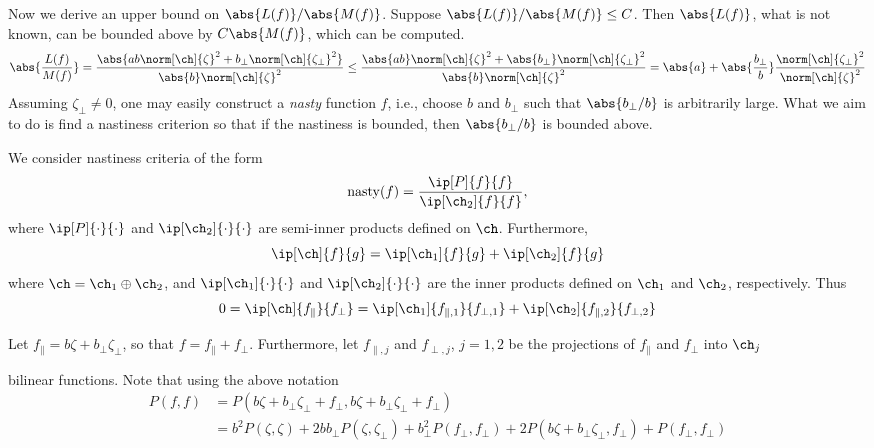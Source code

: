 \documentclass[12pt]{amsart}
\DeclareMathOperator{\nasty}{nasty}
\begin{document}
Now we derive an upper bound on $\abs{L(f)}/\abs{M(f)}$.  Suppose $\abs{L(f)}/\abs{M(f)} \le C$.  Then $\abs{L(f)}$, what is not known, can be bounded above by $C\abs{M(f)}$, which can be computed.
\[
\abs{\frac{L(f)}{M(f)}} = \frac{\abs{ab \norm[\ch]{\zeta}^2 +  b_{\perp} \norm[\ch]{\zeta_{\perp}}^2}}{\abs{b} \norm[\ch]{\zeta}^2} \le \frac{\abs{ab} \norm[\ch]{\zeta}^2 +  \abs{b_{\perp}} \norm[\ch]{\zeta_{\perp}}^2}{\abs{b} \norm[\ch]{\zeta}^2} = \abs{a} +  \abs{\frac{b_{\perp}}{b}} \frac{\norm[\ch]{\zeta_{\perp}}^2}{\norm[\ch]{\zeta}^2}
\]
Assuming $\zeta_{\perp} \ne 0$, one may easily construct a \emph{nasty} function $f$, i.e., choose $b$ and $b_{\perp}$ such that $\abs{b_{\perp}/b}$ is arbitrarily large.  What we aim to do is find a nastiness criterion so that if the nastiness is bounded, then  $\abs{b_{\perp}/b}$ is bounded above.

We consider nastiness criteria of the form
\[
\nasty(f) = \frac{\ip[P]{f}{f}}{\ip[\ch_2]{f}{f}},
\]
where $\ip[P]{\cdot}{\cdot}$ and $\ip[\ch_2]{\cdot}{\cdot}$ are semi-inner products defined on $\ch$.  Furthermore,
\[
\ip[\ch]{f}{g} = \ip[\ch_1]{f}{g} + \ip[\ch_2]{f}{g}
\]
where $\ch=\ch_1 \oplus \ch_2$, and $\ip[\ch_1]{\cdot}{\cdot}$ and $\ip[\ch_2]{\cdot}{\cdot}$ are the inner products defined on $\ch_1$ and $\ch_2$, respectively.  Thus
\[
0 = \ip[\ch]{f_{\parallel}}{f_{\perp}} = \ip[\ch_1]{f_{\parallel,1}}{f_{\perp,1}} + \ip[\ch_2]{f_{\parallel,2}}{f_{\perp,2}}
\]

Let $f_{\parallel} = b \zeta + b_{\perp} \zeta_{\perp}$, so that $f=f_{\parallel} + f_{\perp}$.  Furthermore, let $f_{\parallel,j}$ and $f_{\perp,j}$, $j=1,2$ be the projections of $f_{\parallel}$ and $f_{\perp}$ into $\ch_j$

bilinear functions.  Note that using the above notation
\begin{align*}
P(f,f)& = P(b \zeta + b_{\perp} \zeta_{\perp} + f_{\perp},b \zeta + b_{\perp} \zeta_{\perp} + f_{\perp}) \\
& = b^2 P(\zeta,\zeta) +  2 b b_{\perp}  P(\zeta,\zeta_{\perp})  + b_{\perp}^2 P(f_{\perp},f_{\perp}) + 2 P(b \zeta + b_{\perp} \zeta_{\perp},f_{\perp}) +  P(f_{\perp},f_{\perp})
\end{align*}



\end{document}
